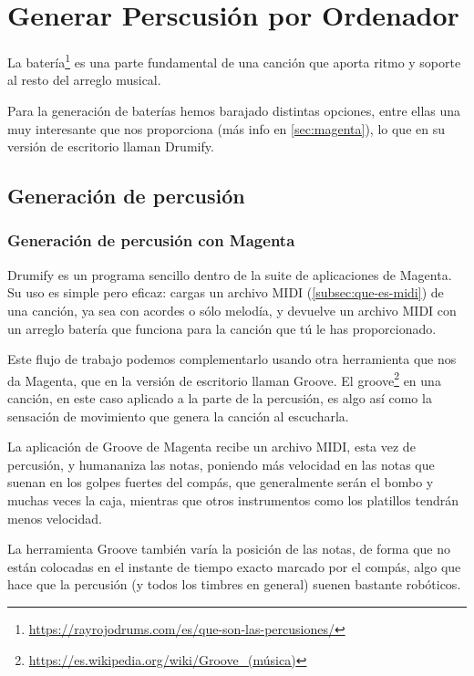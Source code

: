 \chapter{Generar Perscusión por Ordenador}
\label{cap:generacionPercusion}

La batería\footnote{\url{https://rayrojodrums.com/es/que-son-las-percusiones/}} es una parte fundamental de una canción que aporta ritmo y soporte al resto del arreglo musical.

Para la generación de baterías hemos barajado distintas opciones, entre ellas una muy interesante que nos proporciona \cite{MagentaStudio} (más info en \ref{sec:magenta}), lo que en su versión de escritorio llaman Drumify.

\section{Generación de percusión}
\label{sec:generacion-percusion}
    \subsection{Generación de percusión con Magenta}
    \label{subsec:generacion-percusion-magenta}
    Drumify es un programa sencillo dentro de la suite de aplicaciones de Magenta. Su uso es simple pero eficaz: cargas un archivo MIDI (\ref{subsec:que-es-midi}) de una canción, ya sea con acordes o sólo melodía, y devuelve un archivo MIDI con un arreglo batería que funciona para la canción que tú le has proporcionado. 
    
    Este flujo de trabajo podemos complementarlo usando otra herramienta que nos da Magenta, que en la versión de escritorio llaman Groove.
    El groove\footnote{\url{https://es.wikipedia.org/wiki/Groove_(música)}} en una canción, en este caso aplicado a la parte de la percusión, es algo así como la sensación de movimiento que genera la canción al escucharla.
    
    La aplicación de Groove de Magenta recibe un archivo MIDI, esta vez de percusión, y humananiza las notas, poniendo más velocidad en las notas que suenan en los golpes fuertes del compás, que generalmente serán el bombo y muchas veces la caja, mientras que otros instrumentos como los platillos tendrán menos velocidad. 
    
    La herramienta Groove también varía la posición de las notas, de forma que no están colocadas en el instante de tiempo exacto marcado por el compás, algo que hace que la percusión (y todos los timbres en general) suenen bastante robóticos.

